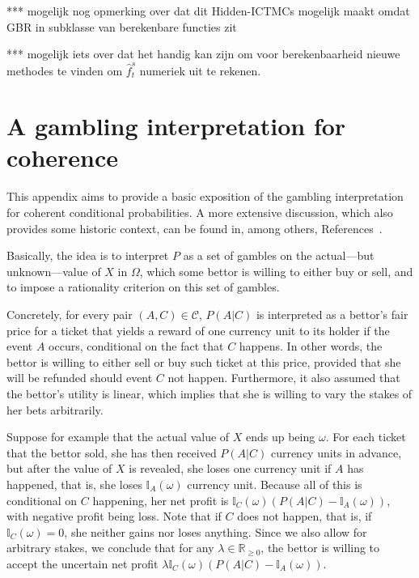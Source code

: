 \documentclass[10pt,a4paper]{paper}
\theoremstyle{definition}
\newcommand{\reals}{\mathbb{R}}
\newcommand{\realsnonneg}{\reals_{\geq 0}}
\newcommand{\ind}[1]{\mathbb{I}_{#1}}
\begin{document}
*** mogelijk nog opmerking over dat dit Hidden-ICTMCs mogelijk maakt omdat GBR in subklasse van berekenbare functies zit

*** mogelijk iets over dat het handig kan zijn om voor berekenbaarheid nieuwe methodes te vinden om $\hat{f}_t^s$ numeriek uit te rekenen.


 


\appendix


\section{A gambling interpretation for coherence}\label{app:coherence}

This appendix aims to provide a basic exposition of the gambling interpretation for coherent conditional probabilities. A more extensive discussion, which also provides some historic context, can be found in, among others, References~\cite{regazzini1985finitely,williams1975,Williams:2007eu, Vicig:2007gs,berti1991coherent, berti2002coherent}.

Basically, the idea is to interpret $P$ as a set of gambles on the actual---but unknown---value of $X$ in $\Omega$, which some bettor is willing to either buy or sell, and to impose a rationality criterion on this set of gambles.

Concretely, for every pair $(A,C)\in\mathcal{C}$, $P(A\vert C)$ is interpreted as a bettor's fair price for a ticket that yields a reward of one currency unit to its holder if the event $A$ occurs, conditional on the fact that $C$ happens. In other words, the bettor is willing to either sell or buy such ticket at this price, provided that she will be refunded should event $C$ not happen. Furthermore, it also assumed that the bettor's utility is linear, which implies that she is willing to vary the stakes of her bets arbitrarily.


Suppose for example that the actual value of $X$ ends up being $\omega$. For each ticket that the bettor sold, she has then received $P(A\vert C)$ currency units in advance, but after the value of $X$ is revealed, she loses one currency unit if $A$ has happened, that is, she loses $\ind{A}(\omega)$ currency unit. Because all of this is conditional on $C$ happening, her net profit is $\ind{C}(\omega)(P(A\vert C) - \ind{A}(\omega))$, with negative profit being loss. Note that if $C$ does not happen, that is, if $\ind{C}(\omega)=0$, she neither gains nor loses anything. Since we also allow for arbitrary stakes, we conclude that for any $\lambda\in\realsnonneg$, the bettor is willing to accept the uncertain net profit $\lambda \ind{C}(\omega)(P(A\vert C) - \ind{A}(\omega))$.
\end{document}
